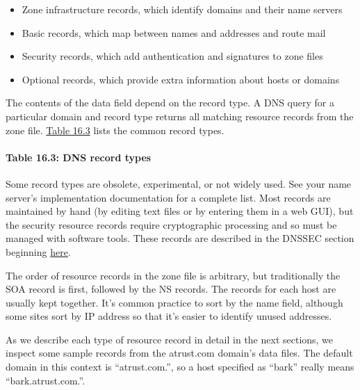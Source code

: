 \begin{itemize}
\tightlist
\item
  Zone infrastructure records, which identify domains and their name
  servers
\item
  Basic records, which map between names and addresses and route mail
\item
  Security records, which add authentication and signatures to zone
  files
\item
  Optional records, which provide extra information about hosts or
  domains
\end{itemize}

The contents of the {data} field depend on the record type. A DNS query
for a particular domain and record type returns all matching resource
records from the zone file.
\protect\hyperlink{part0024_split_021.htmlux5cux23_idTextAnchor872}{Table
16.3} lists the common record types.

\paragraph[{Table 16.3: }DNS record types]{\texorpdfstring{{Table 16.3:
}\protect\hypertarget{part0024_split_021.htmlux5cux23_idIndexMarker2066}{}{}\protect\hypertarget{part0024_split_021.htmlux5cux23_idIndexMarker2067}{}{}\protect\hypertarget{part0024_split_021.htmlux5cux23_idTextAnchor872}{}{}DNS
record types}{Table 16.3: DNS record types}}


Some record types are obsolete, experimental, or not widely used. See
your name server's implementation documentation for a complete list.
Most records are maintained by hand (by editing text files or by
entering them in a web GUI), but the security resource records require
cryptographic processing and so must be managed with software tools.
These records are described in the DNSSEC section beginning
\protect\hyperlink{part0024_split_059.htmlux5cux23_idTextAnchor938}{here}.

The order of resource records in the zone file is arbitrary, but
traditionally the SOA record is first, followed by the NS records. The
records for each host are usually kept together. It's common practice to
sort by the {name} field, although some sites sort by IP address so that
it's easier to identify unused addresses.

As we describe each type of resource record in detail in the next
sections, we inspect some sample records from the atrust.com domain's
data files. The default domain in this context is ``atrust.com.'', so a
host specified as ``bark'' really means ``bark.atrust.com.''.

